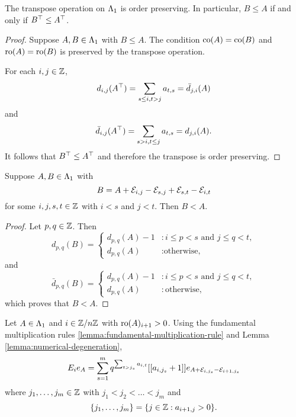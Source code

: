\documentclass[a4paper, 11pt, twoside]{report}
\begin{document}
\begin{lemma}\label{lemma:transpose-preserves-order}
The transpose operation on $\Lambda_1{}$ is order preserving. In particular, $B\le A$ if and only if $B^\top\le A^\top$.
\end{lemma}

\begin{proof}
Suppose $A,B\in\Lambda_1{}$ with $B\le A$. The condition $\operatorname{co}(A)=\operatorname{co}(B)$ and $\operatorname{ro}(A)=\operatorname{ro}(B)$ is preserved by the transpose operation.

For each $i,j\in\mathbb{Z}$,
\begin{equation*}
d_{i,j}{(A^\top)} = \sum_{s\le i,t>j} a_{t,s} = \bar{d}_{j,i}{(A)}
\end{equation*}
and
\begin{equation*}
\bar{d}_{i,j}{(A^\top)} = \sum_{s>i,t\le j} a_{t,s} = d_{j,i}{(A)}.
\end{equation*}
It follows that $B^\top\le A^\top$ and therefore the transpose is order preserving.
\end{proof}

\begin{lemma}\label{lemma:numerical-degeneration}
Suppose $A,B\in\Lambda_1{}$ with
\begin{equation*}
B = A +\mathcal{E}_{i,j} -\mathcal{E}_{s,j} +\mathcal{E}_{s,t} -\mathcal{E}_{i,t}
\end{equation*}
for some $i,j,s,t\in\mathbb{Z}$ with $i<s$ and $j<t$. Then $B<A$.
\end{lemma}

\begin{proof}
Let $p,q\in\mathbb{Z}$. Then
\begin{equation*}
d_{p,q}{(B)} =\begin{cases}
d_{p,q}{(A)} -1 &: i\le p<s \text{ and } j\le q<t,\\
d_{p,q}{(A)} &: \text{otherwise,}
\end{cases}
\end{equation*}
and
\begin{equation*}
\bar{d}_{p,q}{(B)} =\begin{cases}
d_{p,q}{(A)} -1 &: i\le p<s \text{ and } j\le q<t,\\
d_{p,q}{(A)} &: \text{otherwise},
\end{cases}
\end{equation*}
which proves that $B<A$.
\end{proof}

Let $A\in\Lambda_1{}$ and $i\in\mathbb{Z}/{n \mathbb{Z}}$ with $\operatorname{ro}(A)_{i+1}>0$. Using the fundamental multiplication rules \ref{lemma:fundamental-multiplication-rule} and Lemma \ref{lemma:numerical-degeneration},
\begin{equation*}
E_ie_A = \sum_{s=1}^{m} q^{\sum_{t>j_s}a_{i,t}}[[a_{i,j_s}+1]] e_{A+\mathcal{E}_{i,j_s}-\mathcal{E}_{i+1,j_s}}
\end{equation*}
where $j_1,\ldots,j_m\in\mathbb{Z}$ with $j_1<j_2<\ldots<j_m$ and
\begin{equation*}
\{j_1,\ldots,j_m\}=\{j\in\mathbb{Z}: a_{i+1,j}>0\}.
\end{equation*}
\end{document}

